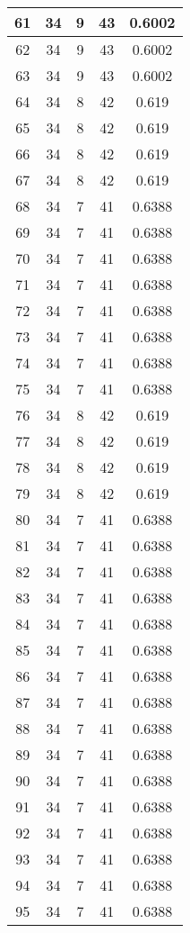 \documentclass[letterpaper, 12pt]{article}
\begin{document}
\begin{longtable}{|c|c|c|c|c|}
\hline
61 & 34 & 9 & 43 & 0.6002 \\
\hline
62 & 34 & 9 & 43 & 0.6002 \\
\hline
63 & 34 & 9 & 43 & 0.6002 \\
\hline
64 & 34 & 8 & 42 & 0.619 \\
\hline
65 & 34 & 8 & 42 & 0.619 \\
\hline
66 & 34 & 8 & 42 & 0.619 \\
\hline
67 & 34 & 8 & 42 & 0.619 \\
\hline
68 & 34 & 7 & 41 & 0.6388 \\
\hline
69 & 34 & 7 & 41 & 0.6388 \\
\hline
70 & 34 & 7 & 41 & 0.6388 \\
\hline
71 & 34 & 7 & 41 & 0.6388 \\
\hline
72 & 34 & 7 & 41 & 0.6388 \\
\hline
73 & 34 & 7 & 41 & 0.6388 \\
\hline
74 & 34 & 7 & 41 & 0.6388 \\
\hline
75 & 34 & 7 & 41 & 0.6388 \\
\hline
76 & 34 & 8 & 42 & 0.619 \\
\hline
77 & 34 & 8 & 42 & 0.619 \\
\hline
78 & 34 & 8 & 42 & 0.619 \\
\hline
79 & 34 & 8 & 42 & 0.619 \\
\hline
80 & 34 & 7 & 41 & 0.6388 \\
\hline
81 & 34 & 7 & 41 & 0.6388 \\
\hline
82 & 34 & 7 & 41 & 0.6388 \\
\hline
83 & 34 & 7 & 41 & 0.6388 \\
\hline
84 & 34 & 7 & 41 & 0.6388 \\
\hline
85 & 34 & 7 & 41 & 0.6388 \\
\hline
86 & 34 & 7 & 41 & 0.6388 \\
\hline
87 & 34 & 7 & 41 & 0.6388 \\
\hline
88 & 34 & 7 & 41 & 0.6388 \\
\hline
89 & 34 & 7 & 41 & 0.6388 \\
\hline
90 & 34 & 7 & 41 & 0.6388 \\
\hline
91 & 34 & 7 & 41 & 0.6388 \\
\hline
92 & 34 & 7 & 41 & 0.6388 \\
\hline
93 & 34 & 7 & 41 & 0.6388 \\
\hline
94 & 34 & 7 & 41 & 0.6388 \\
\hline
95 & 34 & 7 & 41 & 0.6388 \\

\end{longtable}
\end{document}

